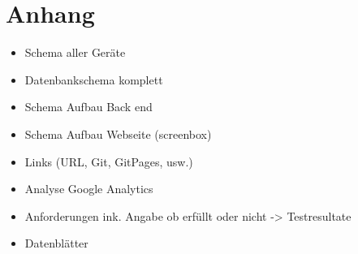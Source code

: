 \section{Anhang}
        
\begin{itemize}
	\item Schema aller Geräte
	\item  Datenbankschema komplett
	\item Schema Aufbau Back end
	\item  Schema Aufbau Webseite (screenbox)
	\item Links (URL, Git, GitPages, usw.)
	\item Analyse Google Analytics
	\item Anforderungen ink. Angabe ob erfüllt oder nicht -> Testresultate
	\item  Datenblätter
\end{itemize}